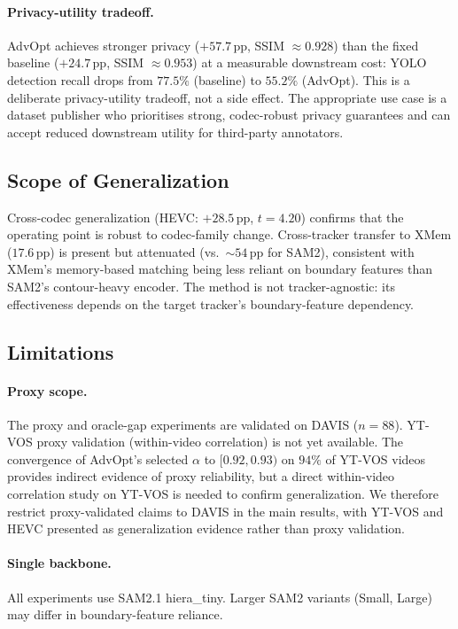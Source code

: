 \paragraph{Privacy-utility tradeoff.}
AdvOpt achieves stronger privacy ($+57.7\,\mathrm{pp}$, SSIM $\approx 0.928$) than the fixed baseline ($+24.7\,\mathrm{pp}$, SSIM $\approx 0.953$) at a measurable downstream cost: YOLO detection recall drops from $77.5\%$ (baseline) to $55.2\%$ (AdvOpt).
This is a deliberate privacy-utility tradeoff, not a side effect.
The appropriate use case is a dataset publisher who prioritises strong, codec-robust privacy guarantees and can accept reduced downstream utility for third-party annotators.

\subsection{Scope of Generalization}

Cross-codec generalization (HEVC: $+28.5\,\mathrm{pp}$, $t=4.20$) confirms that the operating point is robust to codec-family change.
Cross-tracker transfer to XMem ($17.6\,\mathrm{pp}$) is present but attenuated (vs.\ $\sim 54\,\mathrm{pp}$ for SAM2), consistent with XMem's memory-based matching being less reliant on boundary features than SAM2's contour-heavy encoder.
The method is not tracker-agnostic: its effectiveness depends on the target tracker's boundary-feature dependency.

\subsection{Limitations}

\paragraph{Proxy scope.} The proxy and oracle-gap experiments are validated on DAVIS ($n=88$). YT-VOS proxy validation (within-video correlation) is not yet available. The convergence of AdvOpt's selected $\alpha$ to $[0.92, 0.93)$ on $94\%$ of YT-VOS videos provides indirect evidence of proxy reliability, but a direct within-video correlation study on YT-VOS is needed to confirm generalization. We therefore restrict proxy-validated claims to DAVIS in the main results, with YT-VOS and HEVC presented as generalization evidence rather than proxy validation.

\paragraph{Single backbone.} All experiments use SAM2.1 hiera\_tiny. Larger SAM2 variants (Small, Large) may differ in boundary-feature reliance.

